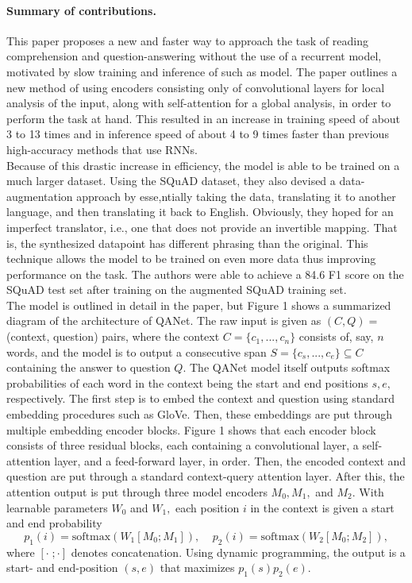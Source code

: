 \documentclass{article}
\begin{document}
\paragraph{Summary of contributions.}
This paper proposes a new and faster way to approach the task of reading comprehension and question-answering without the use of a recurrent model, motivated by slow training and inference of such as model. The paper outlines a new method of using encoders consisting only of convolutional layers for local analysis of the input, along with self-attention for a global analysis, in order to perform the task at hand. This resulted in an increase in training speed of about 3 to 13 times and in inference speed of about 4 to 9 times faster than previous high-accuracy methods that use RNNs. \\
Because of this drastic increase in efficiency, the model is able to be trained on a much larger dataset. Using the SQuAD dataset, they also devised a data-augmentation approach by esse,ntially taking the data, translating it to another language, and then translating it back to English. Obviously, they hoped for an imperfect translator, i.e., one that does not provide an invertible mapping. That is, the synthesized datapoint has different phrasing than the original. This technique allows the model to be trained on even more data thus improving performance on the task. The authors were able to achieve a 84.6 F1 score on the SQuAD test set after training on the augmented SQuAD training set. \\
The model is outlined in detail in the paper, but Figure 1 shows a summarized diagram of the architecture of QANet. The raw input is given as $(C,Q)=$ (context, question) pairs, where the context $C=\{c_1,...,c_n\}$ consists of, say, $n$ words, and the model is to output a consecutive span $S=\{c_s,...,c_e\}\subseteq C$ containing the answer to question $Q.$ The QANet model itself outputs softmax probabilities of each word in the context being the start and end positions $s,e,$ respectively. The first step is to embed the context and question using standard embedding procedures such as GloVe. Then, these embeddings are put through multiple embedding encoder blocks. Figure 1 shows that each encoder block consists of three residual blocks, each containing a convolutional layer, a self-attention layer, and a feed-forward layer, in order. Then, the encoded context and question are put through a standard context-query attention layer. After this, the attention output is put through three model encoders $M_0, M_1,$ and $M_2.$ With learnable parameters $W_0$ and $W_1,$ each position $i$ in the context is given a start and end probability
$$p_1(i)=\text{softmax}(W_1[M_0;M_1]),\;\;\;\; p_2(i)=\text{softmax}(W_2[M_0;M_2]),$$
where $[\cdot \;; \cdot]$ denotes concatenation. Using dynamic programming, the output is a start- and end-position $(s,e)$ that maximizes $p_1(s)p_2(e).$
\end{document}
